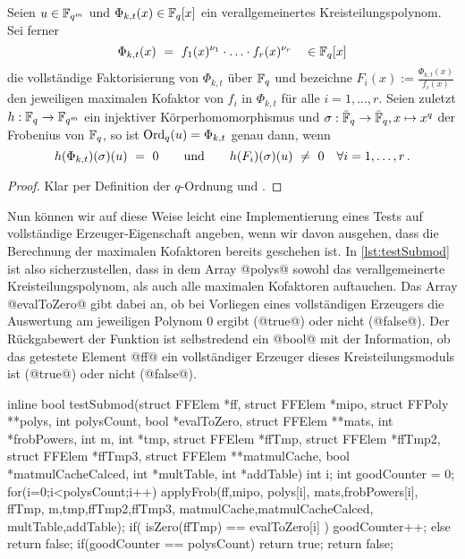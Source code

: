 \begin{lemma}
  Seien $u\in \mathbb{F}_{q^m}$ und $\Phi_{k,t}(x) \in \mathbb{F}_q[x]$ ein verallgemeinertes
  Kreisteilungspolynom. Sei ferner
  \[ \Phi_{k,t}(x)  \ =\  f_1(x)^{\nu_1} \cdot \ldots \cdot
    f_r(x)^{\nu_r}\quad \in \mathbb{F}_q[x]\]
  die vollständige Faktorisierung von $\Phi_{k,t}$ über $\mathbb{F}_q$ und
  bezeichne $F_i(x) := \tfrac{\Phi_{k,t}(x)}{f_i(x)}$ den jeweiligen maximalen
  Kofaktor von $f_i$ in $\Phi_{k,t}$ für alle $i=1,\ldots,r$.
  Seien zuletzt $h: \mathbb{F}_q \to \mathbb{F}_{q^m}$ ein injektiver Körperhomomorphismus und 
  $\sigma:\bar {\mathbb{F}}_q \to \bar {\mathbb{F}}_q, x\mapsto x^q$ der Frobenius von $\mathbb{F}_q$, 
  so ist $\operatorname{Ord}_q(u) = \Phi_{k,t}$ genau dann, wenn
  \[h(\Phi_{k,t})(\sigma)(u) \ =\  0 
    \qquad\text{und}\qquad 
    h(F_i)(\sigma)(u) \ \neq\  0 \quad \forall i=1,\ldots,r \,.\]
\end{lemma}
\begin{proof}
  Klar per Definition der $q$-Ordnung und .
\end{proof}


Nun können wir auf diese Weise leicht eine Implementierung eines Tests auf
vollständige Erzeuger-Eigenschaft angeben, wenn wir davon ausgehen, dass die
Berechnung der maximalen Kofaktoren bereits geschehen ist. In
\autoref{lst:testSubmod} ist also sicherzustellen, dass in dem Array
@polys@ sowohl das verallgemeinerte Kreisteilungspolynom, als auch alle 
maximalen Kofaktoren auftauchen. Das Array @evalToZero@ gibt dabei an, ob 
bei Vorliegen eines vollständigen Erzeugers die Auswertung am jeweiligen
Polynom $0$ ergibt (@true@) oder nicht (@false@). Der Rückgabewert der Funktion
ist selbstredend ein @bool@ mit der Information, ob das getestete Element @ff@
ein vollständiger Erzeuger dieses Kreisteilungsmoduls ist (@true@) oder nicht
(@false@).

\begin{ccode}[caption={[\texttt{bool testSubmod} aus 
 \url{../Sage/enumeratePCNs.c}]Aus \url{../Sage/enumeratePCNs.c}},
  label=lst:testSubmod]
inline bool testSubmod(struct FFElem *ff, struct FFElem *mipo, 
        struct FFPoly **polys,
        int polysCount, bool *evalToZero, 
        struct FFElem **mats, int *frobPowers,
        int m, int *tmp, 
        struct FFElem *ffTmp, struct FFElem *ffTmp2, struct FFElem *ffTmp3, 
        struct FFElem **matmulCache, bool *matmulCacheCalced,
        int *multTable, int *addTable){
    int i;
    int goodCounter = 0;
    for(i=0;i<polysCount;i++){
        applyFrob(ff,mipo,
                polys[i],
                mats,frobPowers[i], ffTmp,
                m,tmp,ffTmp2,ffTmp3,
                matmulCache,matmulCacheCalced,
                multTable,addTable);
        if( isZero(ffTmp) == evalToZero[i] ){
            goodCounter++;
        }else{
            return false;
        }
    }
    if(goodCounter == polysCount){
        return true;
    }
    return false;
}
\end{ccode}


